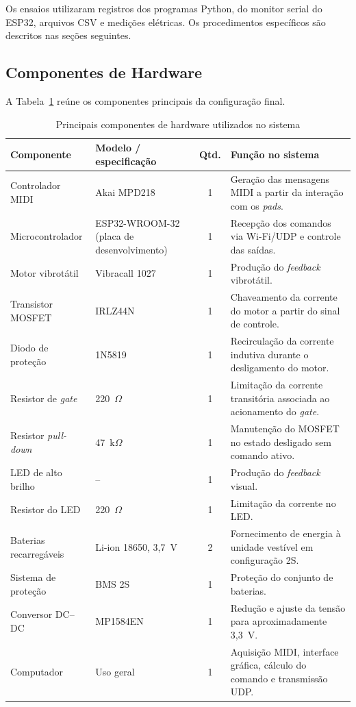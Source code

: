 Os ensaios utilizaram registros dos programas Python, do monitor serial do ESP32, arquivos CSV e medições elétricas. Os procedimentos específicos são descritos nas seções seguintes.

\subsection{Componentes de Hardware}
\label{sec:componentes_hardware}

A Tabela~\ref{tab:componentes_hardware} reúne os componentes principais da configuração final.

\begin{table}[htbp]
\centering
\caption{Principais componentes de hardware utilizados no sistema}
\label{tab:componentes_hardware}
\footnotesize
\begin{tabular}{|p{2.8cm}|p{2.8cm}|c|p{6.8cm}|}
\hline
\textbf{Componente} &
\textbf{Modelo / especificação} &
\textbf{Qtd.} &
\textbf{Função no sistema} \\
\hline
Controlador MIDI & Akai MPD218 & 1 &
Geração das mensagens MIDI a partir da interação com os \textit{pads}. \\
\hline
Microcontrolador & ESP32-WROOM-32 (placa de desenvolvimento) & 1 &
Recepção dos comandos via Wi-Fi/UDP e controle das saídas. \\
\hline
Motor vibrotátil & Vibracall 1027 & 1 &
Produção do \textit{feedback} vibrotátil. \\
\hline
Transistor MOSFET & IRLZ44N & 1 &
Chaveamento da corrente do motor a partir do sinal de controle. \\
\hline
Diodo de proteção & 1N5819 & 1 &
Recirculação da corrente indutiva durante o desligamento do motor. \\
\hline
Resistor de \textit{gate} & 220~$\Omega$ & 1 &
Limitação da corrente transitória associada ao acionamento do \textit{gate}. \\
\hline
Resistor \textit{pull-down} & 47~k$\Omega$ & 1 &
Manutenção do MOSFET no estado desligado sem comando ativo. \\
\hline
LED de alto brilho & -- & 1 &
Produção do \textit{feedback} visual. \\
\hline
Resistor do LED & 220~$\Omega$ & 1 &
Limitação da corrente no LED. \\
\hline
Baterias recarregáveis & Li-ion 18650, 3,7~V & 2 &
Fornecimento de energia à unidade vestível em configuração 2S. \\
\hline
Sistema de proteção & BMS 2S & 1 &
Proteção do conjunto de baterias. \\
\hline
Conversor DC--DC & MP1584EN & 1 &
Redução e ajuste da tensão para aproximadamente 3,3~V. \\
\hline
Computador & Uso geral & 1 &
Aquisição MIDI, interface gráfica, cálculo do comando e transmissão UDP. \\
\hline
\end{tabular}
\end{table}

